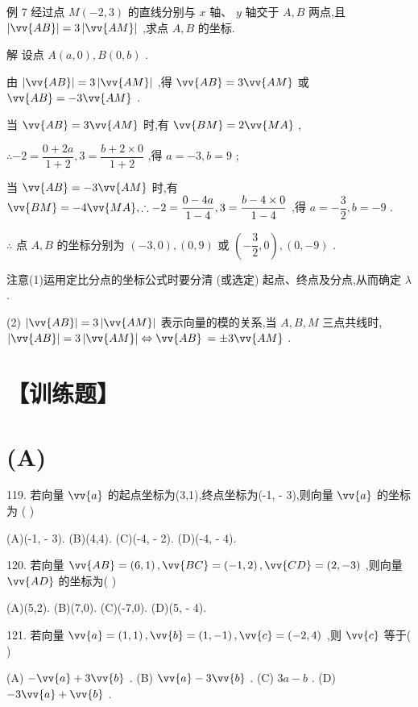 例 7 经过点 $M\left( {-2,3}\right)$ 的直线分别与 $x$ 轴、 $y$ 轴交于 $A,B$ 两点,且 $\left| \vv{AB}\right|  = 3\left| \vv{AM}\right|$ ,求点 $A,B$ 的坐标.

解 设点 $A\left( {a,0}\right) ,B\left( {0,b}\right)$ .

由 $\left| \vv{AB}\right|  = 3\left| \vv{AM}\right|$ ,得 $\vv{AB} = 3\vv{AM}$ 或 $\vv{AB} =  - 3\vv{AM}$ .

当 $\vv{AB} = 3\vv{AM}$ 时,有 $\vv{BM} = 2\vv{MA}$ ,

$\therefore  - 2 = \dfrac{0 + {2a}}{1 + 2},3 = \dfrac{b + 2 \times  0}{1 + 2}$ ,得 $a =  - 3,b = 9$ ;

当 $\vv{AB} =  - 3\vv{AM}$ 时,有 $\vv{BM} =  - 4\vv{MA},\therefore  - 2 = \dfrac{0 - {4a}}{1 - 4},3 = \dfrac{b - 4 \times  0}{1 - 4}$ ,得 $a =  - \dfrac{3}{2},b =  - 9$ .

$\therefore$ 点 $A,B$ 的坐标分别为 $\left( {-3,0}\right) ,\left( {0,9}\right)$ 或 $\left( {-\dfrac{3}{2},0}\right) ,\left( {0, - 9}\right)$ .

注意(1)运用定比分点的坐标公式时要分清 (或选定) 起点、终点及分点,从而确定 $\lambda$ .

(2) $\left| \vv{AB}\right|  = 3\left| \vv{AM}\right|$ 表示向量的模的关系,当 $A,B,M$ 三点共线时, $\left| \vv{AB}\right|  = 3\left| \vv{AM}\right|  \Leftrightarrow  \vv{AB}$  $=  \pm  3\vv{AM}$ .

\section*{【训练题】}

\section*{(A)}

119. 若向量 $\vv{a}$ 的起点坐标为(3,1),终点坐标为(-1, - 3),则向量 $\vv{a}$ 的坐标为 (   )

(A)(-1, - 3). (B)(4,4). (C)(-4, - 2). (D)(-4, - 4).

120. 若向量 $\vv{AB} = \left( {6,1}\right) ,\vv{BC} = \left( {-1,2}\right) ,\vv{CD} = \left( {2, - 3}\right)$ ,则向量 $\vv{AD}$ 的坐标为(   )

(A)(5,2). (B)(7,0). (C)(-7,0). (D)(5, - 4).

121. 若向量 $\vv{a} = \left( {1,1}\right) ,\vv{b} = \left( {1, - 1}\right) ,\vv{c} = \left( {-2,4}\right)$ ,则 $\vv{c}$ 等于(   )

(A) $- \vv{a} + 3\vv{b}$ . (B) $\vv{a} - 3\vv{b}$ . (C) ${3a} - b$ . (D) $- 3\vv{a} + \vv{b}$ .

